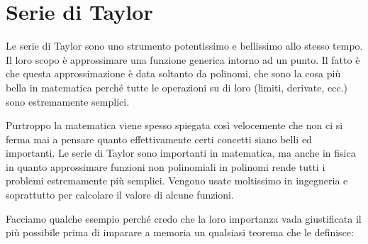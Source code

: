 \section{Serie di Taylor}
Le serie di Taylor sono uno strumento potentissimo e bellissimo allo stesso tempo. Il loro scopo è approssimare una funzione generica intorno ad un punto. Il fatto è che questa approssimazione è data soltanto da polinomi, che sono la cosa più bella in matematica perché tutte le operazioni su di loro (limiti, derivate, ecc.) sono estremamente semplici. 

Purtroppo la matematica viene spesso spiegata così velocemente che non ci si ferma mai a pensare quanto effettivamente certi concetti siano belli ed importanti. Le serie di Taylor sono importanti in matematica, ma anche in fisica in quanto approssimare funzioni non polinomiali in polinomi rende tutti i problemi estremamente più semplici. Vengono usate moltissimo in ingegneria e soprattutto per calcolare il valore di alcune funzioni. 

Facciamo qualche esempio perché credo che la loro importanza vada giustificata il più possibile prima di imparare a memoria un qualsiasi teorema che le definisce:

